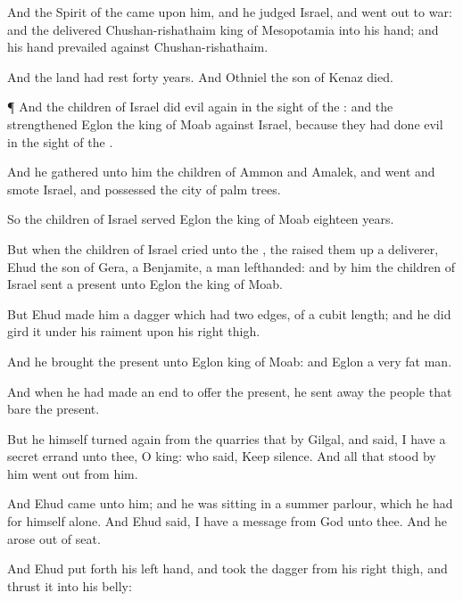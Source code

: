 {And the
Spirit of the
{} came upon him, and he
judged
Israel, and went
out to
war: and the
{}
delivered
Chushan-rishathaim
king of
Mesopotamia into his
hand; and his
hand
prevailed against
Chushan-rishathaim.

And the
land had
rest
forty
years. And
Othniel the
son of
Kenaz
died.


\par }{\PP {}¶ And the
children of
Israel
did
evil
again in the
sight of the
{}: and the
{}
strengthened
Eglon the
king of
Moab against
Israel, because they had
done
evil in the
sight of the
{}.

And he
gathered unto him the
children of
Ammon and
Amalek, and
went and
smote
Israel, and
possessed the
city of palm
trees.

So the
children of
Israel
served
Eglon the
king of
Moab
eighteen
years.

But when the
children of
Israel
cried unto the
{}, the
{} raised them
up a
deliverer,
Ehud the
son of
Gera, a
Benjamite, a
man
lefthanded: and by
him the
children of
Israel
sent a
present unto
Eglon the
king of
Moab.

But
Ehud
made him a
dagger which had
two
edges, of a
cubit
length; and he did
gird it under his
raiment upon his
right
thigh.

And he
brought the
present unto
Eglon
king of
Moab: and
Eglon
{} a
very
fat
man.

And when he had made an
end to
offer the
present, he sent
away the
people that
bare the
present.

But he himself turned
again from the
quarries that
{} by
Gilgal, and
said, I have a
secret
errand unto thee, O
king: who
said, Keep
silence. And all that
stood by him went
out from him.

And
Ehud
came unto him; and he was
sitting in a
summer
parlour, which he had for himself alone. And
Ehud
said, I have a
message from
God unto thee. And he
arose out of
{}
seat.

And
Ehud put
forth his
left
hand, and
took the
dagger from his
right
thigh, and
thrust it into his
belly:

}
